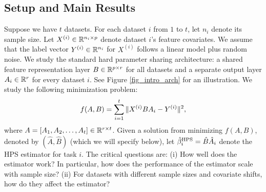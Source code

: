 \documentclass[aos,preprint]{imsart}
\begin{document}
\subsection{Setup and Main Results}

Suppose we have $t$ datasets.
For each dataset $i$ from $1$ to $t$, let $n_i$ denote its sample size.
Let $X^{(i)} \in \mathbb{R}^{n_i \times p}$ denote dataset $i$'s feature covariates.
We assume that the label vector $Y^{(i)} \in \mathbb{R}^{n_i}$ for $X^{(i)}$ follows a linear model plus random noise.
We study the standard hard parameter sharing architecture:
a shared feature representation layer $B\in\mathbb{R}^{p\times r}$ for all datasets and a separate output layer $A_i \in \mathbb{R}^r$ for every dataset $i$.
See Figure \ref{fig_intro_arch} for an illustration.
We study the following minimization problem:
\begin{align}\label{eq_mtl}
			f(A, B) = \sum_{i=1}^t \norm{X^{(i)} B A_i - Y^{(i)}}^2,
\end{align}
where $A = [A_1, A_2, \dots, A_t] \in \mathbb{R}^{r \times t}$.
Given a solution from minimizing $f(A, B)$, denoted by $(\hat{A}, \hat{B})$  (which we will specify below), let $\hat{\beta}_i^{\textup{HPS}} = \hat{B} \hat{A}_i$ denote the HPS estimator for task $i$.
The critical questions are:
(i) How well does the estimator work? In particular, how does the performance of the estimator scale with sample size?
(ii) For datasets with different sample sizes and covariate shifts, how do they affect the estimator?
\end{document}
